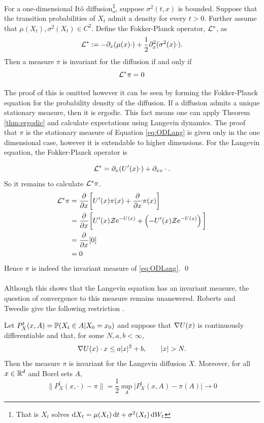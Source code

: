\begin{lemma}
	For a one-dimensional It\^o diffusion\footnote{That is \(X_t\) solves \(\dif X_t = \mu(X_t)\dif t +\sigma^2(X_t)\dif W_t\)}, suppose \(\sigma^2(t,x)\) is bounded. Suppose that the transition probabilities of \(X_t\) admit a density for every \(t>0\). Further assume that \(\mu(X_t),\sigma^2(X_t) \in C^2\). Define the Fokker-Planck operator, \(\L^*\), as
	\[\L^*:= -\partial_x(\mu(x)\cdot)+\frac{1}{2}\partial^2_x(\sigma^2(x)\cdot).\]
	Then a measure \(\pi\) is invariant for the diffusion if and only if
	\[\L^*\pi = 0\]
\end{lemma}
The proof of this is omitted however it can be seen by forming the Fokker-Planck equation for the probability density of the diffusion. If a diffusion admits a unique stationary measure, then it is ergodic. This fact means one can apply Theorem \eqref{thm:ergodic} and calculate expectations using Langevin dynamics. The proof that \(\pi\) is the stationary measure of Equation \eqref{eq:ODLang} is given only in the one dimensional case, however it is extendable to higher dimensions. For the Langevin equation, the Fokker-Planck operator is

\[\L^* = \partial_x(U'(x)\cdot)+\partial_{xx}\cdot . \]
So it remains to calculate \(\L^*\pi\).
\begin{align*}
\L^*\pi &= \pd{}{x}\bigg\lbrack U'(x)\pi(x) + \pd{}{x}\pi(x)\bigg\rbrack\\
		&= \pd{}{x}\bigg\lbrack U'(x)\mathcal{Z}\e^{-U(x)}+ \left(-U'(x)\mathcal{Z}\e^{-U(x)}\right)\bigg\rbrack\\
		&= \pd{}{x}\lbrack 0 \rbrack\\
		&= 0
\end{align*}
Hence \(\pi\) is indeed the invariant measure of \eqref{eq:ODLang}. \qed
\\
\\
Although this shows that the Langevin equation has an invariant measure, the question of convergence to this measure remains unanswered. Roberts and Tweedie give the following restriction \cite{RT96}.
\begin{theorem}
	Let \(P^t_X(x,A) = \P(X_t\in A | X_0 =x_0)\) and suppose that \(\grad U(x)\) is continuously differentiable and that, for some \(N,a,b < \infty\),
	\[\grad U(x)\cdot x \leq a|x|^2 + b, \qquad |x|>N. \]
	Then the measure \(\pi\) is invariant for the Langevin diffusion \(X\). Moreover, for all \(x \in \R^d \) and Borel sets \(A\),
	\[\|P^t_X(x,\cdot) - \pi \| = \frac{1}{2}\sup_A \big|P^t_X(x,A)-\pi(A)\big| \to 0\]

\end{theorem}

